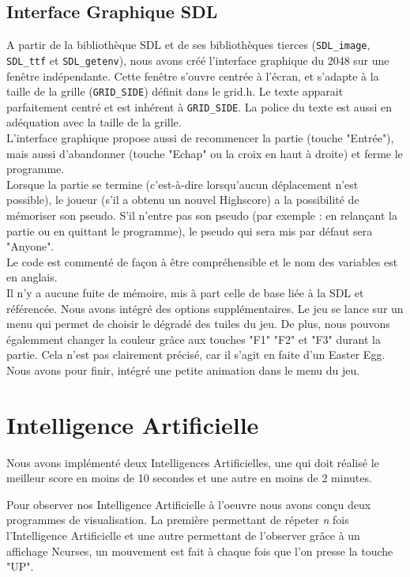 \documentclass[a4paper]{article}
\begin{document}
 \subsection{Interface Graphique SDL}
 \label{sec-4-2}

 A partir de la bibliothèque SDL et de ses bibliothèques tierces (\texttt{SDL\_image}, 
 \texttt{SDL\_ttf} et \texttt{SDL\_getenv}), nous avons créé l'interface graphique du 2048 sur 
 une fenêtre indépendante. Cette fenêtre s'ouvre centrée à l'écran, et s'adapte
 à la taille de la grille (\texttt{GRID\_SIDE}) définit dans le grid.h.
 Le texte apparait parfaitement centré et est inhérent à \texttt{GRID\_SIDE}. La police
 du texte est aussi en adéquation avec la taille de la grille.\\
 L'interface graphique propose aussi de recommencer la partie (touche "Entrée"),
 mais aussi d'abandonner (touche "Echap" ou la croix en haut à droite) et ferme 
 le programme.\\
 Lorsque la partie se termine (c'est-à-dire lorsqu'aucun déplacement n'est possible),
 le joueur (s'il a obtenu un nouvel Highscore) a la possibilité de mémoriser son 
 pseudo. S'il n'entre pas son pseudo (par exemple : en relançant la partie ou en quittant le programme),
 le pseudo qui sera mis par défaut sera "Anyone".\\
 Le code est commenté de façon à être compréhensible et le nom des variables
 est en anglais.\\
 Il n'y a aucune fuite de mémoire, mis à part celle de base liée à la
 SDL et référencée.
 \vspace{0.2cm}
 \noindent
 Nous avons intégré des options supplémentaires. Le jeu se lance sur un
 menu qui permet de choisir le dégradé des tuiles du jeu. De plus, nous
 pouvons égalemment changer la couleur grâce aux touches "F1" "F2" et "F3" durant la partie.
 Cela n'est pas clairement précisé, car il s'agit en faite d'un Easter Egg.\\
 Nous avons pour finir, intégré une petite animation dans le menu du jeu.

 \newpage
 \section{Intelligence Artificielle}
 \label{sec-5}

 Nous avons implémenté deux Intelligences Artificielles, une qui doit
 réalisé le meilleur score en moins de 10 secondes et une autre en moins de 2
 minutes.

 Pour observer nos Intelligence Artificielle à l'oeuvre nous avons
 conçu deux programmes de visualisation. La première permettant de
 répeter \emph{n} fois l'Intelligence Artificielle et une autre permettant
 de l'observer grâce à un affichage Ncurses, un mouvement est fait à
 chaque fois que l'on presse la touche "UP".
\end{document}
